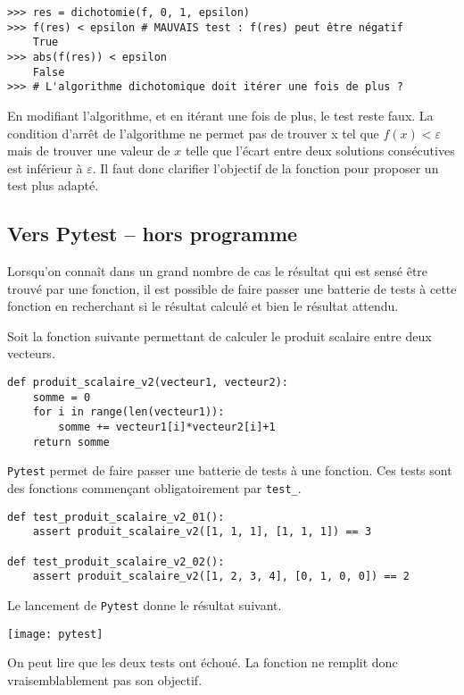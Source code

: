 \begin{lstlisting}
>>> res = dichotomie(f, 0, 1, epsilon)
>>> f(res) < epsilon # MAUVAIS test : f(res) peut être négatif
    True
>>> abs(f(res)) < epsilon 
    False 
>>> # L'algorithme dichotomique doit itérer une fois de plus ?
\end{lstlisting}

En modifiant l'algorithme, et en itérant une fois de plus, le test reste faux. La condition d'arrêt de l'algorithme ne permet pas de trouver x tel que $f(x)<\varepsilon$ mais de trouver une valeur de $x$ telle que l'écart entre deux solutions consécutives est inférieur à $\varepsilon$. Il faut donc clarifier l'objectif de la fonction pour proposer un test plus adapté.



\subsection{Vers Pytest -- hors programme}

Lorsqu'on connaît dans un grand nombre de cas le résultat qui est sensé être trouvé par une fonction, il est possible de faire passer une batterie de tests à cette fonction en recherchant si le résultat calculé et bien le résultat attendu. 

Soit la fonction suivante permettant de calculer le produit scalaire entre deux vecteurs. 
\begin{lstlisting}
def produit_scalaire_v2(vecteur1, vecteur2):
    somme = 0
    for i in range(len(vecteur1)):
        somme += vecteur1[i]*vecteur2[i]+1
    return somme
\end{lstlisting}

\texttt{Pytest} permet de faire passer une batterie de tests à une fonction. Ces tests sont des fonctions commençant obligatoirement par \texttt{test\_}.

\begin{lstlisting}
def test_produit_scalaire_v2_01():
    assert produit_scalaire_v2([1, 1, 1], [1, 1, 1]) == 3

def test_produit_scalaire_v2_02():
    assert produit_scalaire_v2([1, 2, 3, 4], [0, 1, 0, 0]) == 2
\end{lstlisting}

Le lancement de \texttt{Pytest} donne le résultat suivant. 

\begin{center}
\texttt{[image: pytest]}
\end{center}


On peut lire que les deux tests ont échoué. La fonction ne remplit donc vraisemblablement pas son objectif. 

